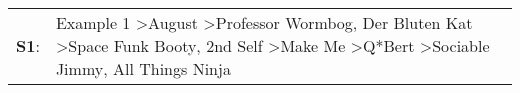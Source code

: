 \begin{supertabular}{p{0.03\textwidth}p{0.92\textwidth}}
 \textbf{S1}:  &  Example 1\textsuperscript{} \textgreater \enspace August\textsuperscript{} \textgreater \enspace Professor Wormbog\textsuperscript{}, \enspace Der Bluten Kat\textsuperscript{} \textgreater \enspace Space Funk Booty\textsuperscript{}, \enspace 2nd Self\textsuperscript{} \textgreater \enspace Make Me\textsuperscript{} \textgreater \enspace Q*Bert\textsuperscript{} \textgreater \enspace Sociable Jimmy\textsuperscript{}, \enspace All Things Ninja\textsuperscript{}  \enspace  \\
\end{supertabular}
